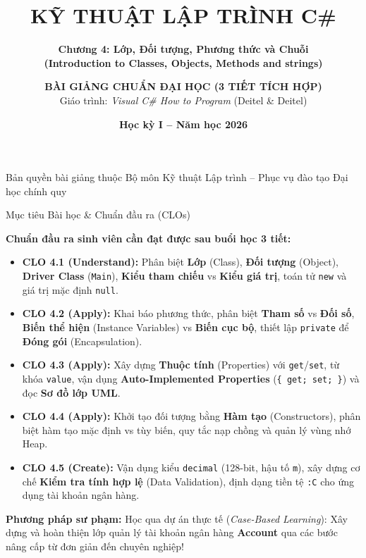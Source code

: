 \documentclass[aspectratio=169, 10pt]{beamer}
\title[\textbf{Lập trình C\# \& .NET -- Chương 4}]{\textbf{\LARGE KỸ THUẬT LẬP TRÌNH C\#}}
\subtitle{\textbf{\large Chương 4: Lớp, Đối tượng, Phương thức và Chuỗi\\(Introduction to Classes, Objects, Methods and strings)}}
\author[\textbf{Khoa CNTT -- IT26M}]{\textbf{BÀI GIẢNG CHUẨN ĐẠI HỌC (3 TIẾT TÍCH HỢP)}\\Giáo trình: \textit{Visual C\# How to Program} (Deitel \& Deitel)}
\institute[\textbf{Lớp IT26M}]{\textbf{Khoa Công nghệ Thông tin -- Đại học Đông Á}\\\textbf{Đối tượng:} Lớp IT26M (Khóa 2026)}
\date[\textbf{2026}]{\textbf{Học kỳ I -- Năm học 2026}}
\begin{document}
\begin{frame}[plain]
  \titlepage
  \begin{center}
    \scriptsize \color{gray} Bản quyền bài giảng thuộc Bộ môn Kỹ thuật Lập trình -- Phục vụ đào tạo Đại học chính quy
  \end{center}
\end{frame}

\begin{frame}{Mục tiêu Bài học \& Chuẩn đầu ra (CLOs)}
  \begin{block}{\textbf{Chuẩn đầu ra sinh viên cần đạt được sau buổi học 3 tiết:}}
    \begin{itemize}
      \item \textbf{CLO 4.1 (Understand):} Phân biệt \textbf{Lớp} (Class), \textbf{Đối tượng} (Object), \textbf{Driver Class} (\texttt{Main}), \textbf{Kiểu tham chiếu} vs \textbf{Kiểu giá trị}, toán tử \texttt{new} và giá trị mặc định \texttt{null}.
      \item \textbf{CLO 4.2 (Apply):} Khai báo phương thức, phân biệt \textbf{Tham số} vs \textbf{Đối số}, \textbf{Biến thể hiện} (Instance Variables) vs \textbf{Biến cục bộ}, thiết lập \texttt{private} để \textbf{Đóng gói} (Encapsulation).
      \item \textbf{CLO 4.3 (Apply):} Xây dựng \textbf{Thuộc tính} (Properties) với \texttt{get}/\texttt{set}, từ khóa \texttt{value}, vận dụng \textbf{Auto-Implemented Properties} (\texttt{\{ get; set; \}}) và đọc \textbf{Sơ đồ lớp UML}.
      \item \textbf{CLO 4.4 (Apply):} Khởi tạo đối tượng bằng \textbf{Hàm tạo} (Constructors), phân biệt hàm tạo mặc định vs tùy biến, quy tắc nạp chồng và quản lý vùng nhớ Heap.
      \item \textbf{CLO 4.5 (Create):} Vận dụng kiểu \texttt{decimal} (128-bit, hậu tố \texttt{m}), xây dựng cơ chế \textbf{Kiểm tra tính hợp lệ} (Data Validation), định dạng tiền tệ \texttt{:C} cho ứng dụng tài khoản ngân hàng.
    \end{itemize}
  \end{block}
  \vspace{-2mm}
  \begin{exampleblock}{\textbf{Phương pháp sư phạm:}}
    Học qua dự án thực tế (\textit{Case-Based Learning}): Xây dựng và hoàn thiện lớp quản lý tài khoản ngân hàng \textbf{Account} qua các bước nâng cấp từ đơn giản đến chuyên nghiệp!
  \end{exampleblock}
\end{frame}
\end{document}

